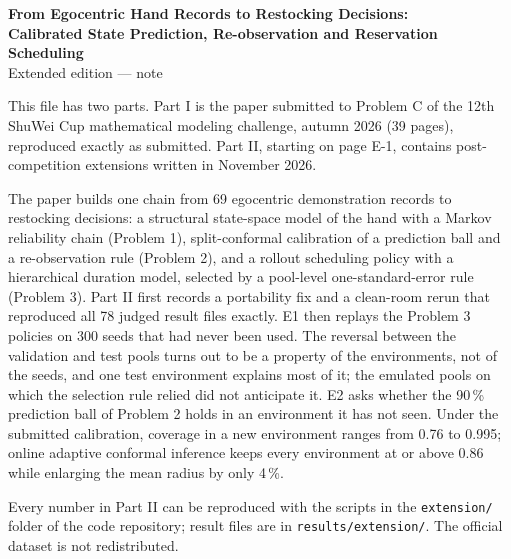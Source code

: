 
\graphicspath{{../../figures/extension/}}

\thispagestyle{empty}
\begin{center}
{\Large\bfseries From Egocentric Hand Records to Restocking Decisions:\\[0.2em] Calibrated State Prediction, Re-observation and Reservation Scheduling}\\[0.7em]
{\large Extended edition --- note}
\end{center}
\vspace{0.8em}

This file has two parts. Part I is the paper submitted to Problem C of the 12th ShuWei Cup mathematical modeling challenge, autumn 2026 (39 pages), reproduced exactly as submitted. Part II, starting on page E-1, contains post-competition extensions written in November 2026.

The paper builds one chain from 69 egocentric demonstration records to restocking decisions: a structural state-space model of the hand with a Markov reliability chain (Problem 1), split-conformal calibration of a prediction ball and a re-observation rule (Problem 2), and a rollout scheduling policy with a hierarchical duration model, selected by a pool-level one-standard-error rule (Problem 3). Part II first records a portability fix and a clean-room rerun that reproduced all 78 judged result files exactly. E1 then replays the Problem 3 policies on 300 seeds that had never been used. The reversal between the validation and test pools turns out to be a property of the environments, not of the seeds, and one test environment explains most of it; the emulated pools on which the selection rule relied did not anticipate it. E2 asks whether the 90\,\% prediction ball of Problem 2 holds in an environment it has not seen. Under the submitted calibration, coverage in a new environment ranges from 0.76 to 0.995; online adaptive conformal inference keeps every environment at or above 0.86 while enlarging the mean radius by only 4\,\%.

Every number in Part II can be reproduced with the scripts in the \texttt{extension/} folder of the code repository; result files are in \texttt{results/extension/}. The official dataset is not redistributed.

